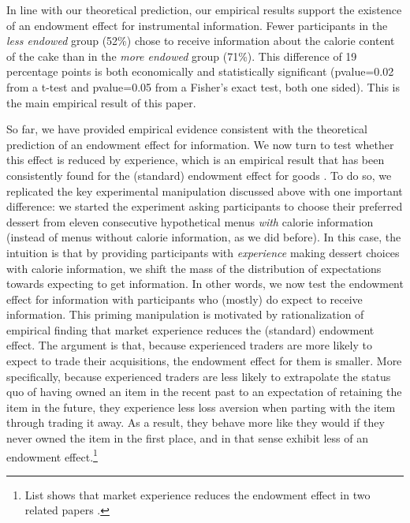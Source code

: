 In line with our theoretical prediction, our empirical results support the existence of an endowment effect for instrumental information. Fewer participants in the \emph{less endowed} group (52\%) chose to receive information about the calorie content of the cake than in the \emph{more endowed} group (71\%). This difference of 19 percentage points is both economically and statistically significant (pvalue=0.02 from a t-test and pvalue=0.05 from a Fisher’s exact test, both one sided). This is the main empirical result of this paper.


So far, we have provided empirical evidence consistent with the theoretical prediction of an endowment effect for information. We now turn to test whether this effect is reduced by experience, which is an empirical result that has been consistently found for the (standard) endowment effect for goods \citep{listDoesMarketExperience2003, engelmannReconsideringEffectMarket2010, listDoesMarketExperience2011}. To do so, we replicated the key experimental manipulation discussed above with one important difference: we started the experiment asking participants to choose their preferred dessert from eleven consecutive hypothetical menus \emph{with} calorie information (instead of menus without calorie information, as we did before).  In this case, the intuition is that by providing participants with \emph{experience} making dessert choices with calorie information, we shift the mass of the distribution of expectations towards expecting to get information. In other words, we now test the endowment effect for information with participants who (mostly) do expect to receive information. This priming manipulation is motivated by  rationalization of  empirical finding that market experience reduces the (standard) endowment effect. The argument is that, because experienced traders are more likely to expect to trade their acquisitions, the endowment effect for them is smaller. More specifically, because experienced traders are less likely to extrapolate the status quo of having owned an item in the recent past to an expectation of retaining the item in the future, they experience less loss aversion when parting with the item through trading it away. As a result, they behave more like they would if they never owned the item in the first place, and in that sense exhibit less of an endowment effect.\footnote{List shows that market experience reduces the endowment effect in two related papers \citep{listDoesMarketExperience2003, listDoesMarketExperience2011}.
}
